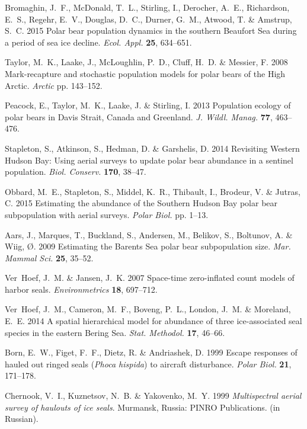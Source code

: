 \documentclass[]{rsos}%
\begin{document}
\begin{thebibliography}{10}
Bromaghin, J.~F., McDonald, T.~L., Stirling, I., Derocher, A.~E., Richardson,
  E.~S., Regehr, E.~V., Douglas, D.~C., Durner, G.~M., Atwood, T. \& Amstrup,
  S.~C. 2015 Polar bear population dynamics in the southern {B}eaufort {S}ea
  during a period of sea ice decline.
 \emph{Ecol. Appl.} \textbf{25}, 634--651.

Taylor, M.~K., Laake, J., McLoughlin, P.~D., Cluff, H.~D. \& Messier, F. 2008
  Mark-recapture and stochastic population models for polar bears of the {H}igh
  {A}rctic.
 \emph{Arctic} pp. 143--152.

Peacock, E., Taylor, M.~K., Laake, J. \& Stirling, I. 2013 Population ecology
  of polar bears in {D}avis {S}trait, {C}anada and {G}reenland.
 \emph{J. Wildl. Manag.} \textbf{77}, 463--476.

Stapleton, S., Atkinson, S., Hedman, D. \& Garshelis, D. 2014 Revisiting
  {W}estern {H}udson {B}ay: Using aerial surveys to update polar bear abundance
  in a sentinel population.
 \emph{Biol. Conserv.} \textbf{170}, 38--47.

Obbard, M.~E., Stapleton, S., Middel, K.~R., Thibault, I., Brodeur, V. \&
  Jutras, C. 2015 Estimating the abundance of the {S}outhern {H}udson {B}ay
  polar bear subpopulation with aerial surveys.
 \emph{Polar Biol.} pp. 1--13.

Aars, J., Marques, T., Buckland, S., Andersen, M., Belikov, S., Boltunov, A. \&
  Wiig, {\O}. 2009 Estimating the {B}arents {S}ea polar bear subpopulation
  size.
 \emph{Mar. Mammal Sci.} \textbf{25}, 35--52.

Ver~Hoef, J.~M. \& Jansen, J.~K. 2007 Space-time zero-inflated count models of
  harbor seals.
 \emph{Environmetrics} \textbf{18}, 697--712.

Ver~Hoef, J.~M., Cameron, M.~F., Boveng, P.~L., London, J.~M. \& Moreland,
  E.~E. 2014 A spatial hierarchical model for abundance of three
  ice-associated seal species in the eastern {B}ering {S}ea.
 \emph{Stat. Methodol.} \textbf{17}, 46--66.

Born, E.~W., Figet, F.~F., Dietz, R. \& Andriashek, D. 1999 Escape responses
  of hauled out ringed seals (\textit{{P}hoca hispida}) to aircraft
  disturbance.
 \emph{Polar Biol.} \textbf{21}, 171--178.

Chernook, V.~I., Kuznetsov, N.~B. \& Yakovenko, M.~Y. 1999 \emph{Multispectral
  aerial survey of haulouts of ice seals}.
 Murmansk, Russia: PINRO Publications.
 (in Russian).


\end{thebibliography}
\end{document}
